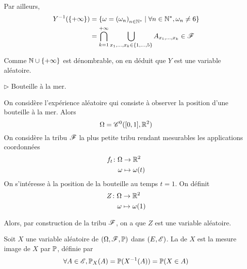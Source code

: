 \begin{exs}
    Par ailleurs,
    \begin{equation*}
        \begin{aligned}
            Y^{-1}(\{+\infty\})
            &= \{\omega={(\omega_n)}_{n\in\mathbb{N}^\ast}\mid \forall n\in\mathbb{N}^\ast, \omega_n\ne 6\}\\
            &= \bigcap_{k=1}^{+\infty}\bigcup_{x_1,\dots,x_{k}\in\{1,\dots,5\}}A_{x_1,\dots,x_{k}}\in\mathscr{F}
        \end{aligned}
    \end{equation*}

    Comme \(\mathbb{N}\cup\{+\infty\}\) est dénombrable, on en déduit que \(Y\) est une variable aléatoire.

    \(\triangleright\) Bouteille à la mer.

    On considère l'expérience aléatoire qui consiste à observer la position d'une bouteille à la mer. Alors
    \begin{equation*}
        \Omega = \mathscr{C}^0(\mathopen{}\left[0,1\right]\mathclose{},\mathbb{R}^2)
    \end{equation*}
    On considère la tribu \(\mathscr{F}\) la plus petite tribu rendant mesurables les applications coordonnées
    \begin{equation*}
        \begin{aligned}
            f_t\colon \Omega&\to \mathbb{R}^2\\
            \omega &\mapsto \omega(t)
        \end{aligned}
    \end{equation*}
    On s'intéresse à la position de la bouteille au temps \(t=1\). On définit
    \begin{equation*}
        \begin{aligned}
            Z\colon \Omega&\to \mathbb{R}^2\\
            \omega&\mapsto \omega(1)
        \end{aligned}
    \end{equation*}

    Alors, par construction de la tribu \(\mathscr{F}\), on a que \(Z\) est une variable aléatoire.
\end{exs}

\begin{definition}
    Soit \(X\) une variable aléatoire de \((\Omega, \mathscr{F}, \mathbb{P})\) dans \((E, \mathscr{E})\). La  de \(X\) est la mesure
    image de \(X\) par \(\mathbb{P}\), définie par
    \begin{equation*}
        \forall A\in\mathscr{E}, \mathbb{P}_X(A) = \mathbb{P}(X^{-1}(A)) = \mathbb{P}(X\in A)
    \end{equation*}
\end{definition}

